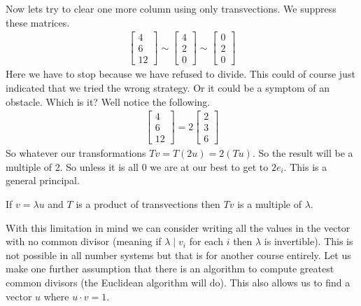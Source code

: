 \documentclass[12pt,twoside,dvipsnames,letterpaper]{memoir}
\begin{document}
Now lets try to clear one more column using only transvections. 
We suppress these matrices.
\begin{align*}
    \begin{bmatrix}
        4\\ 6\\ 12
    \end{bmatrix}
    \sim 
    \begin{bmatrix}
        4\\ 2\\ 0
    \end{bmatrix}
    \sim
    \begin{bmatrix}
        0\\ 2\\ 0
    \end{bmatrix}
\end{align*}
Here we have to stop because we have refused to divide.
This could of course just indicated that we tried the 
wrong strategy.  Or it could be a symptom of an obstacle.
Which is it?  Well notice the following.
\begin{align*}
    \begin{bmatrix}
        4\\ 6\\ 12
    \end{bmatrix}
    =
    2\begin{bmatrix}
        2\\ 3\\ 6
    \end{bmatrix}
\end{align*}
So whatever our transformations $Tv=T(2u)=2(Tu)$.
So the result will 
be a multiple of 2.  So unless it is all $0$ we are at our 
best to get to $2e_i$.  This is a general principal.

\begin{proposition}
    If $v=\lambda u$ and $T$ is a product of transvections
    then $Tv$ is a multiple of $\lambda$.
\end{proposition}

With this limitation in mind we can consider writing 
all the values in the vector with no common divisor
(meaning if $\lambda \mid v_i$ for each $i$ then 
$\lambda$ is invertible).
This is not possible in all number systems but that 
is for another course entirely.
Let us make one further assumption that there is an 
algorithm to compute greatest common divisors (the 
Euclidean algorithm will do).  This also allows us 
to find a vector $u$ where $u\cdot v=1$.  
\end{document}
